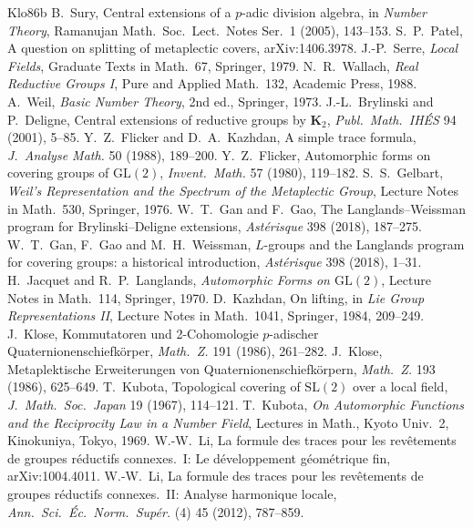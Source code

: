 \documentclass[12pt]{article}
\newcommand{\GL}{\mathrm{GL}}
\newcommand{\SL}{\mathrm{SL}}
\theoremstyle{plain}
\theoremstyle{definition}
\begin{document}
\begin{thebibliography}{Klo86b}
 B.~Sury, Central extensions of a $p$-adic division algebra, in \emph{Number Theory}, Ramanujan Math.\ Soc.\ Lect.\ Notes Ser.\ 1 (2005), 143--153.
 S.~P.~Patel, A question on splitting of metaplectic covers, arXiv:1406.3978.
 J.-P.~Serre, \emph{Local Fields}, Graduate Texts in Math.\ 67, Springer, 1979.
 N.~R.~Wallach, \emph{Real Reductive Groups I}, Pure and Applied Math.\ 132, Academic Press, 1988.
 A.~Weil, \emph{Basic Number Theory}, 2nd ed., Springer, 1973.
 J.-L.~Brylinski and P.~Deligne, Central extensions of reductive groups by $\mathbf K_2$, \emph{Publ.\ Math.\ IH\'ES} 94 (2001), 5--85.
 Y.~Z.~Flicker and D.~A.~Kazhdan, A simple trace formula, \emph{J.\ Analyse Math.} 50 (1988), 189--200.
 Y.~Z.~Flicker, Automorphic forms on covering groups of $\GL(2)$, \emph{Invent.\ Math.} 57 (1980), 119--182.
 S.~S.~Gelbart, \emph{Weil's Representation and the Spectrum of the Metaplectic Group}, Lecture Notes in Math.\ 530, Springer, 1976.
 W.~T.~Gan and F.~Gao, The Langlands--Weissman program for Brylinski--Deligne extensions, \emph{Ast\'erisque} 398 (2018), 187--275.
 W.~T.~Gan, F.~Gao and M.~H.~Weissman, $L$-groups and the Langlands program for covering groups: a historical introduction, \emph{Ast\'erisque} 398 (2018), 1--31.
 H.~Jacquet and R.~P.~Langlands, \emph{Automorphic Forms on $\GL(2)$}, Lecture Notes in Math.\ 114, Springer, 1970.
 D.~Kazhdan, On lifting, in \emph{Lie Group Representations II}, Lecture Notes in Math.\ 1041, Springer, 1984, 209--249.
 J.~Klose, Kommutatoren und 2-Cohomologie $p$-adischer Quaternionenschiefk\"orper, \emph{Math.\ Z.} 191 (1986), 261--282.
 J.~Klose, Metaplektische Erweiterungen von Quaternionenschiefk\"orpern, \emph{Math.\ Z.} 193 (1986), 625--649.
 T.~Kubota, Topological covering of $\SL(2)$ over a local field, \emph{J.\ Math.\ Soc.\ Japan} 19 (1967), 114--121.
 T.~Kubota, \emph{On Automorphic Functions and the Reciprocity Law in a Number Field}, Lectures in Math., Kyoto Univ.\ 2, Kinokuniya, Tokyo, 1969.
 W.-W.~Li, La formule des traces pour les rev\^etements de groupes r\'eductifs connexes.\ I: Le d\'eveloppement g\'eom\'etrique fin, arXiv:1004.4011.
 W.-W.~Li, La formule des traces pour les rev\^etements de groupes r\'eductifs connexes.\ II: Analyse harmonique locale, \emph{Ann.\ Sci.\ \'Ec.\ Norm.\ Sup\'er.} (4) 45 (2012), 787--859.

\end{thebibliography}
\end{document}
